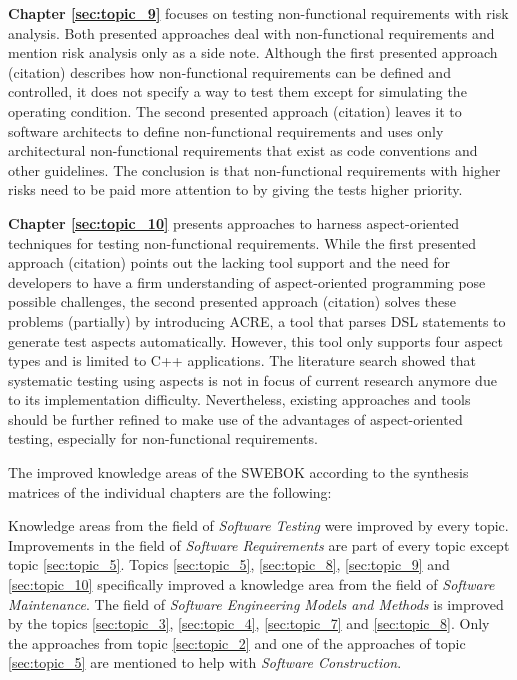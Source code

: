 \textbf{Chapter \ref{sec:topic_9}} focuses on testing non-functional requirements with risk analysis. Both presented approaches deal with non-functional requirements and mention risk analysis only as a side note. Although the first presented approach (citation) describes how non-functional requirements can be defined and controlled, it does not specify a way to test them except for simulating the operating condition. The second presented approach (citation) leaves it to software architects to define non-functional requirements and uses only architectural non-functional requirements that exist as code conventions and other guidelines. The conclusion is that non-functional requirements with higher risks need to be paid more attention to by giving the tests higher priority.

\textbf{Chapter \ref{sec:topic_10}} presents approaches to harness aspect-oriented techniques for testing non-functional requirements. While the first presented approach (citation) points out the lacking tool support and the need for developers to have a firm understanding of aspect-oriented programming pose possible challenges, the second presented approach (citation) solves these problems (partially) by introducing ACRE, a tool that parses DSL statements to generate test aspects automatically. However, this tool only supports four aspect types and is limited to C++ applications. The literature search showed that systematic testing using aspects is not in focus of current research anymore due to its implementation difficulty. Nevertheless, existing approaches and tools should be further refined to make use of the advantages of aspect-oriented testing, especially for non-functional requirements. 


The improved knowledge areas of the SWEBOK according to the synthesis matrices of the individual chapters are the following:

Knowledge areas from the field of \textit{Software Testing} were improved by every topic. Improvements in the field of \textit{Software Requirements} are part of every topic except topic \ref{sec:topic_5}. Topics \ref{sec:topic_5}, \ref{sec:topic_8}, \ref{sec:topic_9} and \ref{sec:topic_10} specifically improved a knowledge area from the field of \textit{Software Maintenance}. The field of \textit{Software Engineering Models and Methods} is improved by the topics \ref{sec:topic_3}, \ref{sec:topic_4}, \ref{sec:topic_7} and \ref{sec:topic_8}. Only the approaches from topic \ref{sec:topic_2} and one of the approaches of topic \ref{sec:topic_5} are mentioned to help with \textit{Software Construction}.


